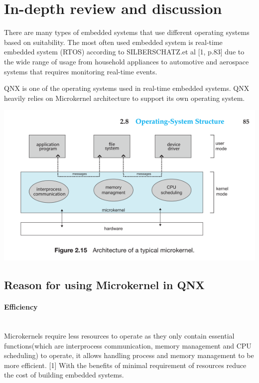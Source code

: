\documentclass[conference]{IEEEtran}
\begin{document}
\section{In-depth review and discussion}
There are many types of embedded systems that use different operating systems based on suitability. The most often used embedded system is real-time embedded system (RTOS) according to SILBERSCHATZ.et al [1, p.83] due to the wide range of usage from household appliances to automotive and aerospace systems that requires monitoring real-time events.

QNX is one of the operating systems used in real-time embedded systems. QNX heavily relies on Microkernel architecture to support its own operating system.

\begin{center}
\includegraphics[scale=0.5]{./images/QNX_OS.png}
\end{center}
\subsection{Reason for using Microkernel in QNX}
\paragraph{Efficiency}\mbox{} \\
Microkernels require less resources to operate as they only contain essential functions(which are interprocess communication, memory management and CPU scheduling) to operate, it allows handling process and memory management to be more efficient. [1] With the benefits of minimal requirement of resources reduce the cost of building embedded systems.
\\
\end{document}
